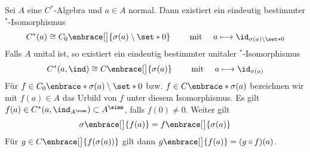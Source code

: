 \begin{satz}[name={Funktionalkalkül},label=funkkal]
	Sei $A$ eine $C^*$-Algebra und $a \in A$ normal.
	Dann existiert ein eindeutig bestimmter ${}^*$-Isomorphismus 
	\[
		C^*(a) \cong C_0 \enbrace[\big]{\sigma(a)\setminus \set*{0}} \qquad \text{ mit }\quad  a \longmapsto \id_{\sigma(a)\setminus \set*{0}}
	\]
	Falls $A$ unital ist, so existiert ein eindeutig bestimmter unitaler ${}^*$-Isomorphismus 
	\[
		C^*(a,\ind) \cong C \enbrace[\big]{\sigma(a)} \qquad \text{ mit }\quad  a \longmapsto \id_{\sigma(a)}
	\]
	Für $f \in C_0\enbrace*{\sigma(a) \setminus \set*{0}}$ bzw. $f \in C \enbrace*{\sigma(a)}$ bezeichnen wir mit $f(a) \in A$ das Urbild von $f$ unter diesem Isomorphismus.
	Es gilt $f(a) \in C^*(a,\ind_{A^\simm}) \subset A^\simm$, falls $f(0)\neq 0$. 
	Weiter gilt 
	\[
		\sigma \enbrace[\big]{f(a)} = f \enbrace[\big]{\sigma(a)}
	\]
	Für $g \in C \enbrace[\big]{f(\sigma(a))}$ gilt dann $g \enbrace[\big]{f(a)}= (g \circ f)(a)$.
\end{satz}
